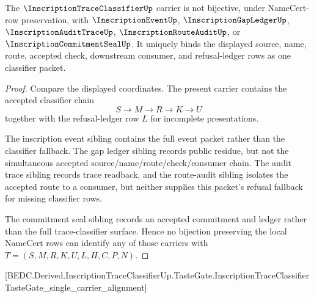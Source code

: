 \begin{theorem}
\label{thm:inscription-trace-classifier-independence-witness}
The $\InscriptionTraceClassifierUp$ carrier is not bijective, under NameCert-row preservation, with $\InscriptionEventUp$, $\InscriptionGapLedgerUp$, $\InscriptionAuditTraceUp$, $\InscriptionRouteAuditUp$, or $\InscriptionCommitmentSealUp$. It uniquely binds the displayed source, name, route, accepted check, downstream consumer, and refusal-ledger rows as one classifier packet.
\end{theorem}
\begin{proof}
Compare the displayed coordinates. The present carrier contains the accepted classifier chain
$$
S \to M \to R \to K \to U
$$
together with the refusal-ledger row $L$ for incomplete presentations.

The inscription event sibling contains the full event packet rather than the classifier fallback. The gap ledger sibling records public residue, but not the simultaneous accepted source/name/route/check/consumer chain. The audit trace sibling records trace readback, and the route-audit sibling isolates the accepted route to a consumer, but neither supplies this packet's refusal fallback for missing classifier rows.

The commitment seal sibling records an accepted commitment and ledger rather than the full trace-classifier surface. Hence no bijection preserving the local NameCert rows can identify any of those carriers with $T=(S,M,R,K,U,L,H,C,P,N)$.
\end{proof}

[BEDC.Derived.InscriptionTraceClassifierUp.TasteGate.InscriptionTraceClassifierTasteGate\_single\_carrier\_alignment]

